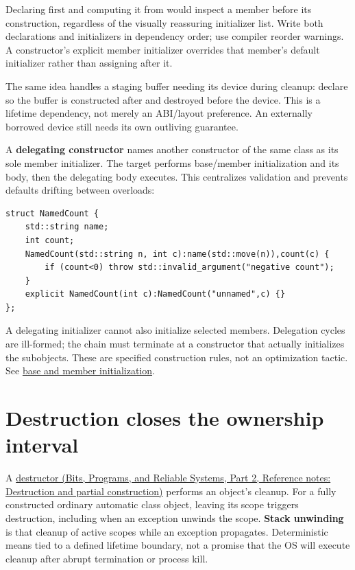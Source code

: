 Declaring  first and computing it from  would inspect a member before its construction, regardless of the visually reassuring initializer list. Write both declarations and initializers in dependency order; use compiler reorder warnings. A constructor's explicit member initializer overrides that member's default initializer rather than assigning after it.

The same idea handles a staging buffer needing its device during cleanup: declare  so the buffer is constructed after and destroyed before the device. This is a lifetime dependency, not merely an ABI/layout preference. An externally borrowed device still needs its own outliving guarantee.

A \textbf{delegating constructor} names another constructor of the same class as its sole member initializer. The target performs base/member initialization and its body, then the delegating body executes. This centralizes validation and prevents defaults drifting between overloads:

\begin{verbatim}
struct NamedCount {
    std::string name;
    int count;
    NamedCount(std::string n, int c):name(std::move(n)),count(c) {
        if (count<0) throw std::invalid_argument("negative count");
    }
    explicit NamedCount(int c):NamedCount("unnamed",c) {}
};
\end{verbatim}

A delegating initializer cannot also initialize selected members. Delegation cycles are ill-formed; the chain must terminate at a constructor that actually initializes the subobjects. These are specified construction rules, not an optimization tactic. See \href{https://eel.is/c++draft/class.base.init}{base and member initialization}.

\section{Destruction closes the ownership interval}\label{05-engine-i-ch003-destruction-closes-the-ownership-interval}

\hypertarget{05-engine-i-ch003-destruction-closes-the-ownership-interval}{}

A \href{../01-Bits-Programs-and-Reliable-Systems-P02/main.pdf\#nameddest=appendix-9bfe377cef7a}{destructor (Bits, Programs, and Reliable Systems, Part 2, Reference notes: Destruction and partial construction)} performs an object's cleanup. For a fully constructed ordinary automatic class object, leaving its scope triggers destruction, including when an exception unwinds the scope. \textbf{Stack unwinding} is that cleanup of active scopes while an exception propagates. Deterministic means tied to a defined lifetime boundary, not a promise that the OS will execute cleanup after abrupt termination or process kill.

